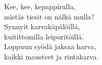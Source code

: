 
            Kee, kee, kepappirulla, \\
            mistäs tiesit on nälkä mulla? \\
            Synnyit karvakäpälöillä, \\
            kuitittomilla leipuritöillä. \\
            Loppuun syödä jaksaa harva, \\
            kaikki mausteet ja rintakarva. \\
